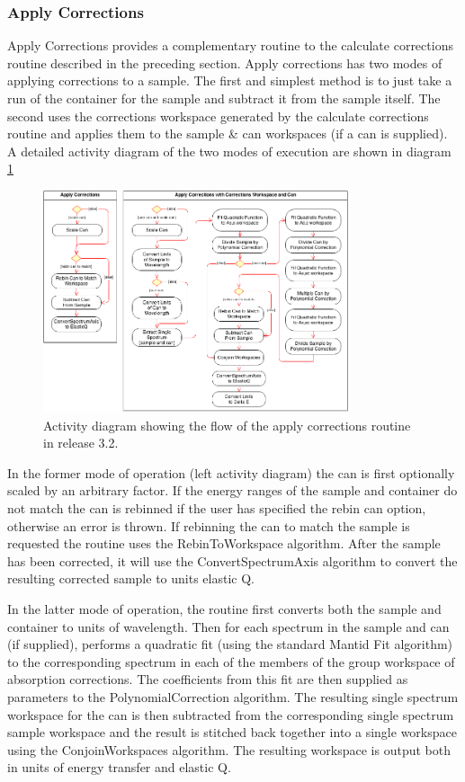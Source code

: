 \documentclass[paper=a4, fontsize=11pt]{scrartcl}	%
\numberwithin{equation}{section}															%
\numberwithin{figure}{section}																%
\numberwithin{table}{section}																%
\begin{document}
\subsubsection{Apply Corrections}
\label{subsubsec:apply-corrections}

Apply Corrections provides a complementary routine to the calculate corrections routine described in the preceding section. Apply corrections has two modes of applying corrections to a sample. The first and simplest method is to just take a run of the container for the sample and subtract it from the sample itself. The second uses the corrections workspace generated by the calculate corrections routine and applies them to the sample \& can workspaces (if a can is supplied). A detailed activity diagram of the two modes of execution are shown in diagram \ref{fig:applycorr-activity-diagram}

\begin{figure}[H]
\centering
\includegraphics[width=0.8\textwidth]{img/uml/activity_diagrams/ApplyCorr_activity.png}
\caption{Activity diagram showing the flow of the apply corrections routine in release 3.2.}
\label{fig:applycorr-activity-diagram}
\end{figure}

In the former mode of operation (left activity diagram) the can is first optionally scaled by an arbitrary factor. If the energy ranges of the sample and container do not match the can is rebinned if the user has specified the rebin can option, otherwise an error is thrown. If rebinning the can to match the sample is requested the routine uses the RebinToWorkspace algorithm. After the sample has been corrected, it will use the ConvertSpectrumAxis algorithm to convert the resulting corrected sample to units elastic Q.

In the latter mode of operation, the routine first converts both the sample and container to units of wavelength. Then for each spectrum in the sample and can (if supplied), performs a quadratic fit (using the standard Mantid Fit algorithm) to the corresponding spectrum in each of the members of the group workspace of absorption corrections. The coefficients from this fit are then supplied as parameters to the PolynomialCorrection algorithm. The resulting single spectrum workspace for the can is then subtracted from the corresponding single spectrum sample workspace and the result is stitched back together into a single workspace using the ConjoinWorkspaces algorithm. The resulting workspace is output both in units of energy transfer and elastic Q.
\end{document}
